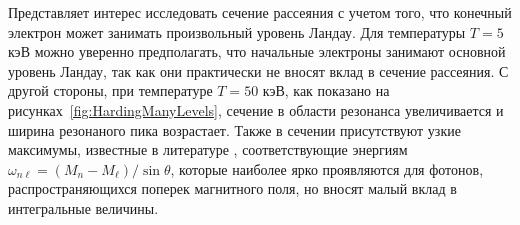 Представляет интерес исследовать сечение рассеяния с учетом того, что конечный электрон может занимать произвольный уровень Ландау. Для температуры $T=5$ кэВ можно уверенно предполагать, что начальные электроны занимают основной уровень Ландау, так как они практически не вносят вклад в сечение рассеяния. С другой стороны, при температуре $T=50$ кэВ, как показано на рисунках~\ref{fig:HardingManyLevels}, сечение в области резонанса увеличивается и ширина резонаного пика возрастает. Также в сечении присутствуют узкие максимумы, известные в литературе 
, соответствующие энергиям $\omega_{n\ell}=(M_n-M_\ell)/\sin \theta$, которые наиболее ярко проявляются для фотонов, распространяющихся поперек магнитного поля, но вносят малый вклад в интегральные величины.


